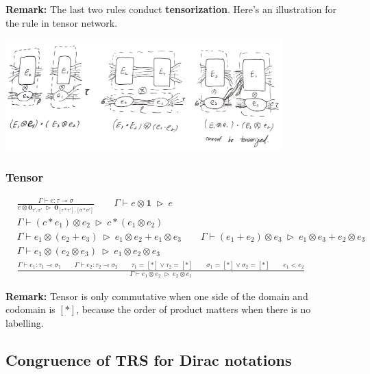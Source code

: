 \textbf{Remark: } The last two rules conduct \textbf{tensorization}. Here's an illustration for the rule in tensor network.
\begin{center}
\includegraphics*[width=0.8\textwidth]{fig/tn_example.png}
\end{center}


\subsubsection*{Tensor}
\begin{align*}
  & \frac{\Gamma \vdash e : \tau \multimap \sigma}{e \otimes \textbf{0}_{\tau', \sigma'} \ \triangleright\ \textbf{0}_{[\tau * \tau'], [\sigma * \sigma']}}
  \qquad \Gamma \vdash e \otimes \mathbf{1} \ \triangleright\ e\\
  & \Gamma \vdash (c * e_1) \otimes e_2 \ \triangleright\ c * (e_1 \otimes e_2)\\
  & \Gamma \vdash e_1 \otimes (e_2 + e_3) \ \triangleright\ e_1 \otimes e_2 + e_1 \otimes e_3
  \qquad 
  \Gamma \vdash (e_1 + e_2) \otimes e_3 \ \triangleright\ e_1 \otimes e_3 + e_2 \otimes e_3\\
  & \Gamma \vdash e_1 \otimes (e_2 \otimes e_3) \ \triangleright\ e_1 \otimes e_2 \otimes e_3\\
  & \frac{\Gamma \vdash e_1 : \tau_1 \multimap \sigma_1 \qquad \Gamma \vdash e_2 : \tau_2 \multimap \sigma_2 \qquad \tau_1 = [*] \vee \tau_2 = [*]\qquad \sigma_1 = [*] \vee \sigma_2 = [*] \qquad e_1 < e_2}{\Gamma \vdash e_1 \otimes e_2 \ \triangleright\ e_2 \otimes e_1}
\end{align*}

\textbf{Remark: } Tensor is only commutative when one side of the domain and codomain is $[*]$, because the order of product matters when there is no labelling.


\subsection{Congruence of TRS for Dirac notations}

